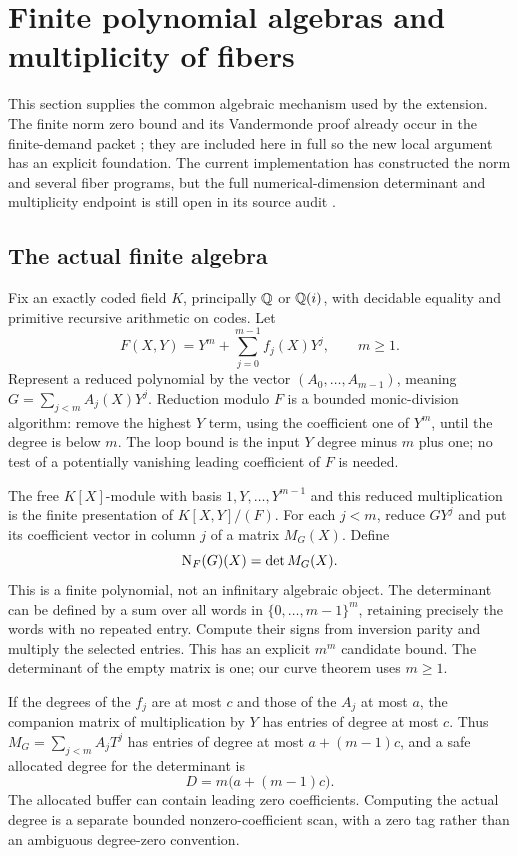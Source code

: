 \section{Finite polynomial algebras and multiplicity of fibers}
\label{sec:norm}

This section supplies the common algebraic mechanism used by the extension. The finite norm zero bound and its Vandermonde proof already occur in the finite-demand packet \cite{repo-norm}; they are included here in full so the new local argument has an explicit foundation. The current implementation has constructed the norm and several fiber programs, but the full numerical-dimension determinant and multiplicity endpoint is still open in its source audit \cite{repo-audit}.

\subsection{The actual finite algebra}

Fix an exactly coded field $K$, principally $\mathbb Q$ or $\mathbb Q(i)$, with decidable equality and primitive recursive arithmetic on codes. Let
\[
 F(X,Y)=Y^m+\sum_{j=0}^{m-1}f_j(X)Y^j,\qquad m\ge1.
\]
Represent a reduced polynomial by the vector $(A_0,\ldots,A_{m-1})$, meaning $G=\sum_{j<m}A_j(X)Y^j$. Reduction modulo $F$ is a bounded monic-division algorithm: remove the highest $Y$ term, using the coefficient one of $Y^m$, until the degree is below $m$. The loop bound is the input $Y$ degree minus $m$ plus one; no test of a potentially vanishing leading coefficient of $F$ is needed.

The free $K[X]$-module with basis $1,Y,\ldots,Y^{m-1}$ and this reduced multiplication is the finite presentation of $K[X,Y]/(F)$. For each $j<m$, reduce $GY^j$ and put its coefficient vector in column $j$ of a matrix $M_G(X)$. Define
\[
 \operatorname{N}_F(G)(X)=\det M_G(X).
\]
This is a finite polynomial, not an infinitary algebraic object. The determinant can be defined by a sum over all words in $\{0,\ldots,m-1\}^m$, retaining precisely the words with no repeated entry. Compute their signs from inversion parity and multiply the selected entries. This has an explicit $m^m$ candidate bound. The determinant of the empty matrix is one; our curve theorem uses $m\ge1$.

If the degrees of the $f_j$ are at most $c$ and those of the $A_j$ at most $a$, the companion matrix of multiplication by $Y$ has entries of degree at most $c$. Thus $M_G=\sum_{j<m}A_jT^j$ has entries of degree at most $a+(m-1)c$, and a safe allocated degree for the determinant is
\begin{equation}\label{eq:coarse-degree}
 D=m\bigl(a+(m-1)c\bigr).
\end{equation}
The allocated buffer can contain leading zero coefficients. Computing the actual degree is a separate bounded nonzero-coefficient scan, with a zero tag rather than an ambiguous degree-zero convention.

